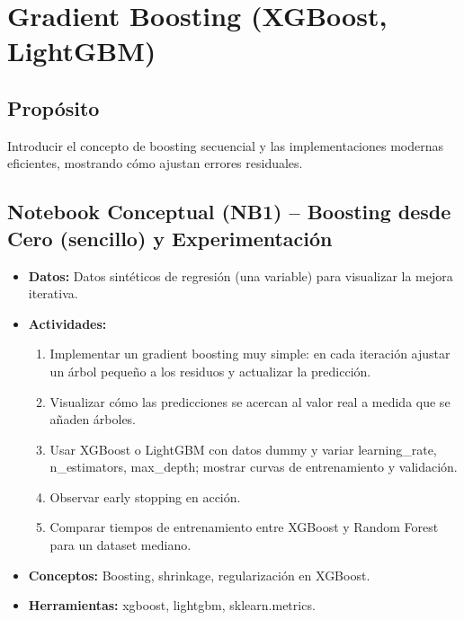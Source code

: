 \documentclass[12pt,a4paper]{article}
\begin{document}
\section{Gradient Boosting (XGBoost, LightGBM)}
\subsection*{Propósito}
Introducir el concepto de boosting secuencial y las implementaciones modernas eficientes, mostrando cómo ajustan errores residuales.

\subsection*{Notebook Conceptual (NB1) – Boosting desde Cero (sencillo) y Experimentación}
\begin{itemize}
    \item \textbf{Datos:} Datos sintéticos de regresión (una variable) para visualizar la mejora iterativa.
    \item \textbf{Actividades:}
    \begin{enumerate}
        \item Implementar un gradient boosting muy simple: en cada iteración ajustar un árbol pequeño a los residuos y actualizar la predicción.
        \item Visualizar cómo las predicciones se acercan al valor real a medida que se añaden árboles.
        \item Usar XGBoost o LightGBM con datos dummy y variar learning\_rate, n\_estimators, max\_depth; mostrar curvas de entrenamiento y validación.
        \item Observar early stopping en acción.
        \item Comparar tiempos de entrenamiento entre XGBoost y Random Forest para un dataset mediano.
    \end{enumerate}
    \item \textbf{Conceptos:} Boosting, shrinkage, regularización en XGBoost.
    \item \textbf{Herramientas:} xgboost, lightgbm, sklearn.metrics.
\end{itemize}
\end{document}
